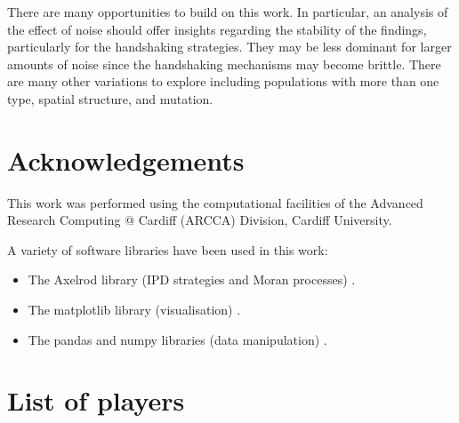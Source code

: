 \documentclass{article}
\begin{document}
There are many opportunities to build on this work. In particular, an analysis
of the effect of noise should offer insights regarding the stability of the findings,
particularly for the handshaking strategies. They may be less dominant for
larger amounts of noise since the handshaking mechanisms may become brittle.
There are many other variations to explore including populations with more
than one type, spatial structure, and mutation.

\section*{Acknowledgements}

This work was performed using the computational facilities of the Advanced
Research Computing @ Cardiff (ARCCA) Division, Cardiff University.

A variety of software libraries have been used in this work:

\begin{itemize}
    \item The Axelrod library (IPD strategies and Moran processes)
        \cite{axelrodproject}.
    \item The matplotlib library (visualisation) \cite{hunter2007matplotlib}.
    \item The pandas and numpy libraries (data manipulation)
        \cite{mckinney2010data, walt2011numpy}.
\end{itemize}

\printbibliography

\appendix

\section{List of players}\label{app:list_of_players}

\begin{multicols}{2}
	\begin{enumerate}
		
	\end{enumerate}
\end{multicols}
\end{document}
